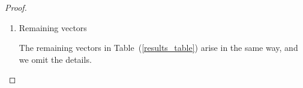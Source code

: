 \documentclass[smallcondensed]{svjour3}                     %
\begin{document}
\begin{proof}
\begin{enumerate}
Therefore consider the final case. This requires a solution to the Diophantine equation
\[(e, e) + 3 k_0^2 = 14 = \sum_{i=1}^n k_i^2.\]
There are two partitions of 14 into sums of squares respecting both (\ref{k_0_ordering}) and (\ref{3k_0gesum}), and they are:
\begin{enumerate}
\item 2, 1, 1, 1, 1, 1, 1, 1, 1, 1, 1;
\item 1, 1, 1, 1, 1, 1, 1, 1, 1, 1, 1, 1, 1, 1.
\end{enumerate}
The first of these represents the vector $2( v_0 + v_1) + v_2 + \ldots + v_{11}$, and as such arises in 11 or more dimensions, while the second, $2 v_0 + v_1 + \ldots + v_{13}$, does not appear until $n=13$. The inner product between them is zero, so they are mutually admissable.

\item Remaining vectors

The remaining vectors in Table~(\ref{results_table}) arise in the same way, and we omit the details.
\end{enumerate}

\end{proof}
\end{document}
